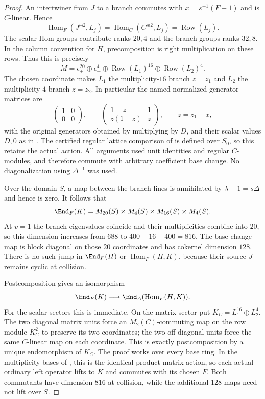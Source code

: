 \begin{proof}
An intertwiner from $J$ to a branch commutes with
$x=s^{-1}(F-1)$ and is $C$-linear. Hence
\[
 \operatorname{Hom}_F(J^{\oplus2},L_j)
    =\operatorname{Hom}_C(C^{\oplus2},L_j)
    =\operatorname{Row}(L_j).
\]
The scalar Hom groups contribute ranks $20,4$ and the branch
groups ranks $32,8$. In the column convention for $H$,
precomposition is right multiplication on these rows.
Thus this is precisely
\[
 M=\epsilon_+^{20}\oplus\epsilon_-^4
       \oplus\operatorname{Row}(L_1)^{16}
       \oplus\operatorname{Row}(L_2)^4.
\]
The chosen coordinate makes $L_1$ the multiplicity-$16$
branch $z=z_1$ and $L_2$ the multiplicity-$4$ branch $z=z_2$.
In particular the named normalized generator matrices are
\[
 \begin{pmatrix}1&0\\0&0\end{pmatrix},\qquad
 \begin{pmatrix}1-z&1\\z(1-z)&z\end{pmatrix},
 \qquad z=z_1-x,
\]
with the original generators obtained by multiplying by $D$,
and their scalar values $D,0$ as in .
The certified regular lattice comparison of 
is defined over $S_0$, so this retains the actual action.
All arguments used unit identities and regular $C$-modules,
and therefore commute with arbitrary coefficient base change.
No diagonalization using $\Delta^{-1}$ was used.

Over the domain $S$, a map between the branch lines is
annihilated by $\lambda-1=s\Delta$ and hence is zero.
It follows that
\begin{equation}\label{eq:cayleycommutant}
 \End_F(K)=M_{20}(S)\times M_4(S)\times M_{16}(S)\times M_4(S).
\end{equation}
At $v=1$ the branch eigenvalues coincide and their multiplicities
combine into $20$, so this dimension increases from $688$ to
$400+16+400=816$. The base-change map is block diagonal
on those $20$ coordinates and has cokernel dimension $128$.
There is no such jump in $\End_F(H)$ or $\operatorname{Hom}_F(H,K)$,
because their source $J$ remains cyclic at collision.

Postcomposition gives an isomorphism
\[
 \End_F(K)\longrightarrow\End_A(\operatorname{Hom}_F(H,K)).
\]
For the scalar sectors this is immediate. On the matrix sector
put $K_C=L_1^{16}\oplus L_2^4$. The two diagonal matrix units
force an $M_2(C)$-commuting map on the row module $K_C^2$
to preserve its two coordinates; the two off-diagonal units
force the same $C$-linear map on each coordinate.
This is exactly postcomposition by a unique endomorphism of
$K_C$. The proof works over every base ring.
In the multiplicity bases of , this is the identical
product-matrix action, so each actual ordinary left operator
lifts to $K$ and commutes with its chosen $F$.
Both commutants have dimension $816$ at collision, while
the additional $128$ maps need not lift over $S$.


\end{proof}

